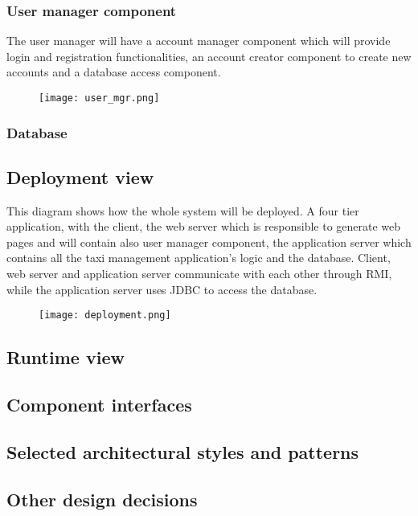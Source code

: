 	\subsubsection{User manager component}
		The user manager will have a account manager component which will provide login and registration functionalities, an account creator component to create new accounts and a database access component.
		\begin{figure}[h!]
			\centering
			\texttt{[image: user\_mgr.png]}
		\end{figure}
		\newpage
	
	\subsubsection{Database}
	\begin{figure}[h!]
		\centering
	\end{figure}
	\newpage		

\subsection{Deployment view}
This diagram shows how the whole system will be deployed.
A four tier application, with the client, the web server which is responsible to generate web pages and will contain also user manager component, the application server which contains all the taxi management application's logic and the database.
Client, web server and application server communicate with each other through RMI, while the application server uses JDBC to access the database.
	\begin{figure}[h!]
		\centering
		\texttt{[image: deployment.png]}
	\end{figure}
	\newpage

\subsection{Runtime view}

\subsection{Component interfaces}

\subsection{Selected architectural styles and patterns}

\subsection{Other design decisions}